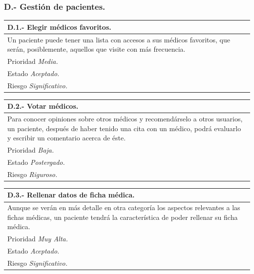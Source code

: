 \documentclass[a4paper,oneside,11pt]{book}
\begin{document}
\subsubsection{D.- Gestión de pacientes.}

\begin{center}
\begin{tabulary}{15cm}{|L|}
	\hline
		\bf{D.1.- Elegir médicos favoritos.} \\
	\hline
		Un paciente puede tener una lista con accesos a sus médicos favoritos, que serán, posiblemente, aquellos que visite con más frecuencia. \\
	\hline
		Prioridad \textit{Media.} \\
	\hline
		Estado \textit{Aceptado.} \\
	\hline
		Riesgo \textit{Significativo.} \\
	\hline
\end{tabulary}
\end{center}

\begin{center}
\begin{tabulary}{15cm}{|L|}
	\hline
		\bf{D.2.- Votar médicos.} \\
	\hline
		Para conocer opiniones sobre otros médicos y recomendárselo a otros usuarios, un paciente, después de haber tenido una cita con un médico, podrá evaluarlo y escribir un comentario acerca de éste. \\
	\hline
		Prioridad \textit{Baja.} \\
	\hline
		Estado \textit{Postergado.} \\
	\hline
		Riesgo \textit{Riguroso.} \\
	\hline
\end{tabulary}
\end{center}

\begin{center}
\begin{tabulary}{15cm}{|L|}
	\hline
		\bf{D.3.- Rellenar datos de ficha médica.} \\
	\hline
		Aunque se verán en más detalle en otra categoría los aspectos relevantes a las fichas médicas, un paciente tendrá la característica de poder rellenar su ficha médica. \\
	\hline
		Prioridad \textit{Muy Alta.} \\
	\hline
		Estado \textit{Aceptado.} \\
	\hline
		Riesgo \textit{Significativo.} \\
	\hline
\end{tabulary}
\end{center}
\end{document}
